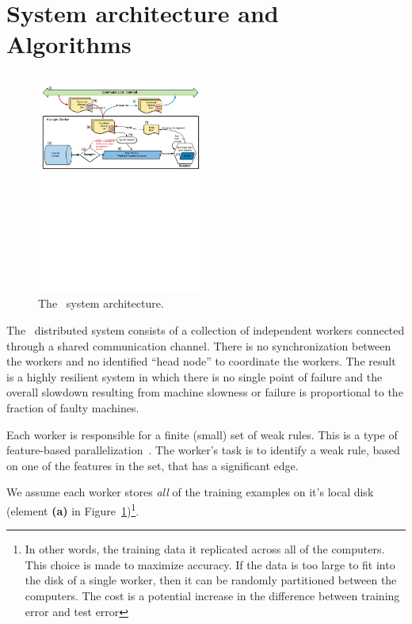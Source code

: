 \section{System architecture and Algorithms} \label{sec:Algorithms}

\begin{figure}
\centering
    \includegraphics[width=0.5\textwidth]{figs/architecture.pdf}
    \caption{The \Sparrow\ system architecture.}\label{fig:architecture}
    \vspace{0pt}
\end{figure}

The \Sparrow\ distributed system consists of a collection of independent workers
connected through a shared communication channel. There is no
synchronization between the workers and no identified ``head node'' to
coordinate the workers. The result is a highly resilient system in which
there is no single point of failure and the overall slowdown resulting
from machine slowness or failure is proportional to the fraction of
faulty machines.

Each worker is responsible for a finite (small) set of weak
rules. This is a type of feature-based
parallelization~\cite{caragea_framework_2004}. The worker's task is to
identify a weak rule, based on one of the features in the set, that has
a significant edge.

We assume each worker stores {\em all} of the training examples
on it's local disk (element {\bf (a)} in Figure~\ref{fig:architecture})\footnote{In other
  words, the training data it replicated across all of the
  computers. This choice is made to maximize accuracy. If the data is
  too large to fit into the disk of a single worker, then it can be
  randomly partitioned between the computers. The cost is a potential increase
  in the difference between training error and test error}.

